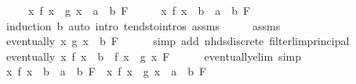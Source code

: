 \begin{isabellebody}
\ \ \ \ \ {\isachardoublequoteopen}{\isacharparenleft}{\kern0pt}{\isacharparenleft}{\kern0pt}{\isasymlambda}x{\isachardot}{\kern0pt}\ f\ x\ {\isacharcircum}{\kern0pt}\ g\ x{\isacharparenright}{\kern0pt}\ {\isasymlonglongrightarrow}\ a\ {\isacharcircum}{\kern0pt}\ b{\isacharparenright}{\kern0pt}\ F{\isachardoublequoteclose}\isanewline
%
\isadelimproof
%
\endisadelimproof
%
\isatagproof
{}\isamarkupfalse%
\ {\isacharminus}{\kern0pt}\isanewline
\ \ \isamarkupfalse%
\ {\isachardoublequoteopen}{\isacharparenleft}{\kern0pt}{\isacharparenleft}{\kern0pt}{\isasymlambda}x{\isachardot}{\kern0pt}\ f\ x\ {\isacharcircum}{\kern0pt}\ b{\isacharparenright}{\kern0pt}\ {\isasymlonglongrightarrow}\ a\ {\isacharcircum}{\kern0pt}\ b{\isacharparenright}{\kern0pt}\ F{\isachardoublequoteclose}\isanewline
\ \ \ \ \isamarkupfalse%
\ {\isacharparenleft}{\kern0pt}induction\ b{\isacharparenright}{\kern0pt}\ {\isacharparenleft}{\kern0pt}auto\ intro{\isacharcolon}{\kern0pt}\ tendsto{\isacharunderscore}{\kern0pt}intros\ assms{\isacharparenright}{\kern0pt}\isanewline
\ \ \isamarkupfalse%
\ \isamarkupfalse%
\ assms{\isacharparenleft}{\kern0pt}{}{\isacharparenright}{\kern0pt}\ \isamarkupfalse%
\ {\isachardoublequoteopen}eventually\ {\isacharparenleft}{\kern0pt}{\isasymlambda}x{\isachardot}{\kern0pt}\ g\ x\ {\isacharequal}{\kern0pt}\ b{\isacharparenright}{\kern0pt}\ F{\isachardoublequoteclose}\isanewline
\ \ \ \ \isamarkupfalse%
\ {\isacharparenleft}{\kern0pt}simp\ add{\isacharcolon}{\kern0pt}\ nhds{\isacharunderscore}{\kern0pt}discrete\ filterlim{\isacharunderscore}{\kern0pt}principal{\isacharparenright}{\kern0pt}\isanewline
\ \ \isamarkupfalse%
\ {\isachardoublequoteopen}eventually\ {\isacharparenleft}{\kern0pt}{\isasymlambda}x{\isachardot}{\kern0pt}\ f\ x\ {\isacharcircum}{\kern0pt}\ b\ {\isacharequal}{\kern0pt}\ f\ x\ {\isacharcircum}{\kern0pt}\ g\ x{\isacharparenright}{\kern0pt}\ F{\isachardoublequoteclose}\isanewline
\ \ \ \ \isamarkupfalse%
\ eventually{\isacharunderscore}{\kern0pt}elim\ simp\isanewline
\ \ \isamarkupfalse%
\ {\isachardoublequoteopen}{\isacharparenleft}{\kern0pt}{\isacharparenleft}{\kern0pt}{\isasymlambda}x{\isachardot}{\kern0pt}\ f\ x\ {\isacharcircum}{\kern0pt}\ b{\isacharparenright}{\kern0pt}\ {\isasymlonglongrightarrow}\ a\ {\isacharcircum}{\kern0pt}\ b{\isacharparenright}{\kern0pt}\ F\ {\isasymlongleftrightarrow}\ {\isacharparenleft}{\kern0pt}{\isacharparenleft}{\kern0pt}{\isasymlambda}x{\isachardot}{\kern0pt}\ f\ x\ {\isacharcircum}{\kern0pt}\ g\ x{\isacharparenright}{\kern0pt}\ {\isasymlonglongrightarrow}\ a\ {\isacharcircum}{\kern0pt}\ b{\isacharparenright}{\kern0pt}\ F{\isachardoublequoteclose}\isanewline

\end{isabellebody}
